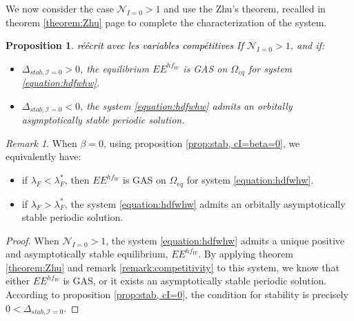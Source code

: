 \documentclass{article}
\newcommand{\lfw}{\lambda_{F}}
\newcommand{\lfw}{\lambda_{F}}
\newcommand{\cI}{\mathcal{I}}
\newcommand{\vdeux}[1]{\textcolor{black}{#1}}
\newtheorem{prop}[theorem]{Proposition}
\theoremstyle{definition}
\theoremstyle{remark}
\newtheorem{remark}[theorem]{Remark}
\begin{document}
%
%

We now consider the case $\mathcal{N}_{I = 0} > 1$ and use the Zhu's  theorem, recalled in theorem \ref{theorem:Zhu} page \pageref{theorem:Zhu} to complete the characterization of the system.

\begin{prop}
\vdeux{réécrit avec les variables compétitives}
\label{prop:limitCycle, cI=0}
If $\mathcal{N}_{I =0} > 1$, and if:
\begin{itemize}
\item $\Delta_{stab, \cI =0} > 0$, the equilibrium $EE^{hf_W}$ is GAS on $\Omega_{eq}$ for system \eqref{equation:hdfwhw}.
\item $\Delta_{stab, \cI =0} < 0$, the system \eqref{equation:hdfwhw} admits an orbitally asymptotically stable periodic solution.
\end{itemize}
\end{prop}

\begin{remark}
When $\beta = 0$, using proposition \ref{prop:stab, cI=beta=0}, we equivalently have:
\begin{itemize}
\item if $\lfw <  \lfw^*$, then $EE^{hf_W}$ is GAS on $\Omega_{eq}$ for system \eqref{equation:hdfwhw}.
\item if $\lfw  > \lfw^*$, the system \eqref{equation:hdfwhw} admits an orbitally asymptotically stable periodic solution.
\end{itemize}
\end{remark}

\begin{proof}
When $\mathcal{N}_{I =0} > 1$, the system \eqref{equation:hdfwhw} admits a unique positive and asymptotically stable equilibrium, $EE^{hf_W}$. By applying theorem \ref{theorem:Zhu} and remark \ref{remark:competitivity} to this system, we know that either $EE^{hf_W}$ is GAS, or it exists an asymptotically stable periodic solution. According to proposition \ref{prop:stab, cI=0}, the condition for stability is precisely $0 < \Delta_{stab, \cI =0}$. 
\end{proof}
\end{document}
